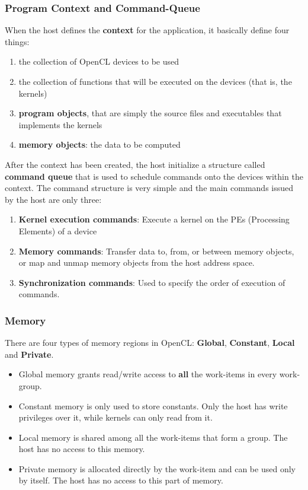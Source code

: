 \subsubsection{Program Context and Command-Queue} \label{sect:context}

When the host defines the \textbf{context} for the application, it basically define four things:

\begin{enumerate}
	\item the collection of OpenCL devices to be used
	\item the collection of functions that will be executed on the devices (that is, the kernels)
	\item \textbf{program objects}, that are simply the source files and executables that implements the kernels
	\item \textbf{memory objects}: the data to be computed
\end{enumerate}

After the context has been created, the host initialize a structure called \textbf{command queue} that is used to schedule commands onto the devices within the context. The command structure is very simple and the main commands issued by the host are only three:

\begin{enumerate}
	\item \textbf{Kernel execution commands}: Execute a kernel on the PEs (Processing Elements) of a device
	\item \textbf{Memory commands}: Transfer data to, from, or between memory objects, or map and unmap
memory objects from the host address space.
	\item	\textbf{Synchronization commands}: Used to specify the order of execution of commands.
\end{enumerate}

\subsubsection{Memory}

There are four types of memory regions in OpenCL: \textbf{Global}, \textbf{Constant}, \textbf{Local} and \textbf{Private}.

\begin{itemize}
	\item Global memory grants read/write access to \textbf{all} the work-items in every work-group.
	\item Constant memory is only used to store constants. Only the host has write privileges over it, while kernels can only read from it.
	\item Local memory is shared among all the work-items that form a group. The host has no access to this memory.
	\item Private memory is allocated directly by the work-item and can be used only by itself. The host has no access to this part of memory.
\end{itemize}

